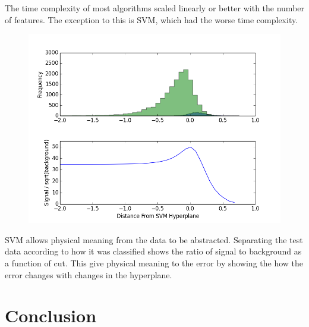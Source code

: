 \documentclass[aps, reprint, amsmath, amssymb]{revtex4-1}
\begin{document}
The time complexity of most algorithms scaled linearly or better with the number of features.  The exception to this is SVM, which had the worse time complexity. 

\begin{figure}[H]
    \centering
    \includegraphics[width=\columnwidth]{signal-to-noise-9Even.png}
\end{figure}

SVM allows physical meaning from the data to be abstracted.  Separating the test data according to how it was classified shows the ratio of signal to background as a function of cut.  This give physical meaning to the error by showing the how the error changes with changes in the hyperplane.

\section{Conclusion}
\end{document}

